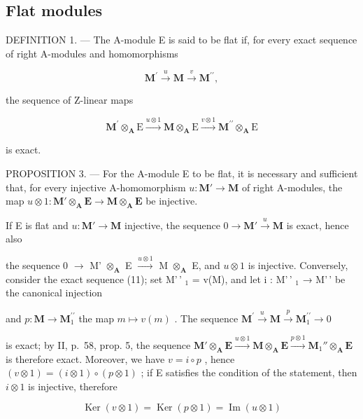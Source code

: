 \subsection{Flat modules}

DEFINITION 1. --- The A-module E is said to be flat if, for every exact sequence of right A-modules and homomorphisms

\[
\mathbf {M} ^ {\prime} \xrightarrow {u} \mathbf {M} \xrightarrow {v} \mathbf {M} ^ {\prime \prime},\tag{11}
\]

the sequence of Z-linear maps

\[
\mathbf {M} ^ {\prime} \otimes_ {\mathbf {A}} \mathrm{E} \xrightarrow {u \otimes 1} \mathbf {M} \otimes_ {\mathbf {A}} \mathrm{E} \xrightarrow {v \otimes 1} \mathbf {M} ^ {\prime \prime} \otimes_ {\mathbf {A}} \mathrm{E}\tag{12}
\]

is exact.

PROPOSITION 3. --- For the A-module E to be flat, it is necessary and sufficient that, for every injective A-homomorphism \(u: \mathbf{M}' \to \mathbf{M}\) of right A-modules, the map \(u \otimes 1: \mathbf{M}' \otimes_{\mathbf{A}} \mathbf{E} \to \mathbf{M} \otimes_{\mathbf{A}} \mathbf{E}\) be injective.

If E is flat and \(u: \mathbf{M}' \to \mathbf{M}\) injective, the sequence \(0 \longrightarrow \mathbf{M}' \stackrel{u}{\longrightarrow} \mathbf{M}\) is exact, hence also

the sequence 0 \(\longrightarrow\) M' \(\otimes_{\mathbf{A}}\) E \(\xrightarrow{u\otimes1}\) M \(\otimes_{\mathbf{A}}\) E, and \(u\otimes1\) is injective. Conversely, consider the exact sequence (11); set M'\,' \(_{1}\) = v(M), and let i : M'\,' \(_{1}\) → M'\,' be the canonical injection

and \(p:\mathbf{M}\to\mathbf{M}_{1}^{\prime\prime}\) the map \(m\mapsto v(m)\) . The sequence \(\mathbf{M}^{\prime}\xrightarrow{u}\mathbf{M}\xrightarrow{p}\mathbf{M}_{1}^{\prime\prime}\longrightarrow0\)

is exact; by II, p.~58, prop. 5, the sequence \(\mathbf{M}' \otimes_{\mathbf{A}} \mathbf{E} \xrightarrow{u \otimes 1} \mathbf{M} \otimes_{\mathbf{A}} \mathbf{E} \xrightarrow{p \otimes 1} \mathbf{M}_{1}'' \otimes_{\mathbf{A}} \mathbf{E}\) is therefore exact. Moreover, we have \(v = i \circ p\) , hence \((v \otimes 1) = (i \otimes 1) \circ (p \otimes 1)\) ; if E satisfies the condition of the statement, then \(i \otimes 1\) is injective, therefore

\[
\operatorname{Ker} (v \otimes 1) = \operatorname{Ker} (p \otimes 1) = \operatorname{Im} (u \otimes 1)
\]

